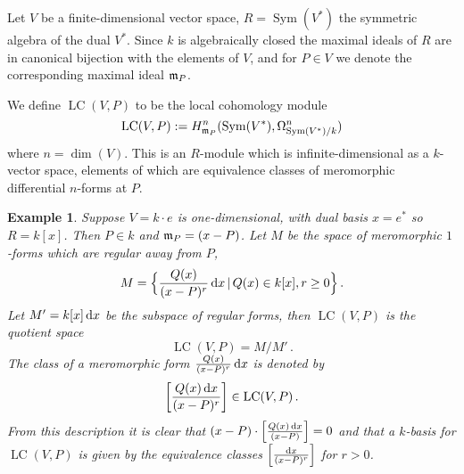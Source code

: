 \documentclass[english,letter paper,12pt,reqno]{article}
\theoremstyle{example}
\newtheorem{example}[theorem]{Example}
\numberwithin{equation}{section}
\DeclareMathOperator{\Sym}{Sym}
\DeclareMathOperator{\LC}{LC}
\begin{document}
Let $V$ be a finite-dimensional vector space, $R = \Sym(V^*)$ the symmetric algebra of the dual $V^*$. Since $k$ is algebraically closed the maximal ideals of $R$ are in canonical bijection with the elements of $V$, and for $P \in V$ we denote the corresponding maximal ideal $\mathfrak{m}_P$. 

We define $\LC(V,P)$ to be the local cohomology module
\[
\LC(V,P) := H^n_{\mf{m}_P}(\Sym(V^*), \Omega^n_{\Sym(V^*)/k})
\]
where $n = \dim(V)$. This is an $R$-module which is infinite-dimensional as a $k$-vector space, elements of which are equivalence classes of meromorphic differential $n$-forms at $P$.

\begin{example} Suppose $V = k \cdot e$ is one-dimensional, with dual basis $x = e^*$ so $R = k[x]$. Then $P \in k$ and $\mathfrak{m}_P = (x-P)$. Let $M$ be the space of meromorphic $1$-forms which are regular away from $P$,
\[
M = \Big\{ \frac{Q(x)}{(x-P)^r} \operatorname{d}\!{x} \,|\, Q(x) \in k[x], r \ge 0 \Big\}\,.
\]
Let $M' = k[x] \operatorname{d}\!{x}$ be the subspace of regular forms, then $\LC(V,P)$ is the quotient space
\[
\LC( V, P ) = M / M'\,.
\]
The class of a meromorphic form $\frac{Q(x)}{(x-P)^r} \operatorname{d}\!{x}$ is denoted by
\begin{equation}\label{eq:gen_frac_1d}
\left[ \frac{Q(x) \ud{x}}{(x-P)^r} \right] \in \LC(V,P)\,.
\end{equation}
From this description it is clear that $(x-P) \cdot \left[ \frac{Q(x) \operatorname{d}\!{x}}{(x-P)} \right] = 0$ and that a $k$-basis for $\LC(V,P)$ is given by the equivalence classes $\left[ \frac{\operatorname{d}\!{x}}{(x-P)^r} \right]$ for $r > 0$.
\end{example}
\end{document}
